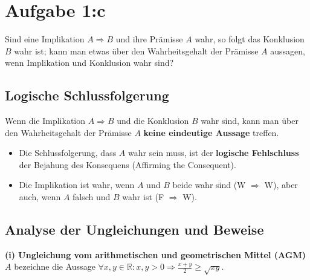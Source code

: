 \documentclass{article}
\begin{document}
\section*{Aufgabe 1:c}
Sind eine Implikation $A \Rightarrow B$ und ihre Prämisse $A$ wahr, so folgt das Konklusion $B$ wahr ist; kann man etwas über den Wahrheitsgehalt der Prämisse $A$ aussagen, wenn Implikation und Konklusion wahr sind?

\subsection*{Logische Schlussfolgerung}
Wenn die Implikation $A \Rightarrow B$ und die Konklusion $B$ wahr sind, kann man über den Wahrheitsgehalt der Prämisse $A$ \textbf{keine eindeutige Aussage} treffen.

\begin{itemize}
    \item Die Schlussfolgerung, dass $A$ wahr sein muss, ist der \textbf{logische Fehlschluss} der Bejahung des Konsequens (Affirming the Consequent).
    \item Die Implikation ist wahr, wenn $A$ und $B$ beide wahr sind (W $\Rightarrow$ W), aber auch, wenn $A$ falsch und $B$ wahr ist (F $\Rightarrow$ W).
\end{itemize}

\bigskip

\subsection*{Analyse der Ungleichungen und Beweise}

\textbf{(i) Ungleichung vom arithmetischen und geometrischen Mittel (AGM)}
$A$ bezeichne die Aussage $\forall x, y \in \mathbb{R}: x, y > 0 \Rightarrow \frac{x+y}{2} \geq \sqrt{xy}$.
\end{document}
